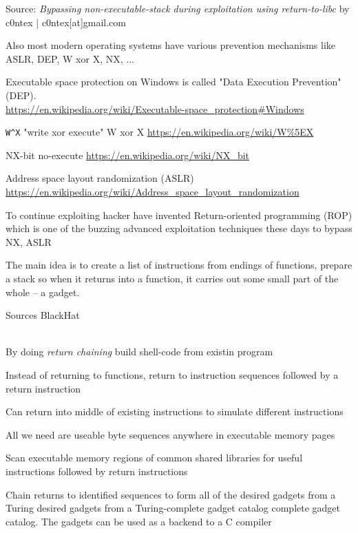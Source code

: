 \documentclass[Screen16to9,17pt]{foils}
\begin{document}
Source:
\emph{Bypassing non-executable-stack during exploitation using return-to-libc}
 by c0ntex | c0ntex[at]gmail.com



Also most modern operating systems have various prevention mechanisms like ASLR, DEP, W xor X, NX, ...

\begin{list2}
\item Executable space protection on Windows is called "Data Execution Prevention" (DEP).\\
\url{https://en.wikipedia.org/wiki/Executable-space_protection#Windows}
\item \verb+W^X+ "write xor execute" W xor X \url{https://en.wikipedia.org/wiki/W%5EX}
\item NX-bit no-execute \url{https://en.wikipedia.org/wiki/NX_bit}
\item Address space layout randomization (ASLR) \url{https://en.wikipedia.org/wiki/Address_space_layout_randomization}
\end{list2}


To continue exploiting hacker have invented Return-oriented programming (ROP)
which is one of the buzzing advanced exploitation techniques these days to bypass NX, ASLR

The main idea is to create a list of instructions from endings of functions, prepare a stack so when it returns into a function, it carries out some small part of the whole -- a gadget.

Sources BlackHat\\
\\
{\footnotesize{}}



\begin{list2}
\item By doing \emph{return chaining} build shell-code from existin program
\item Instead of returning to
functions, return to
instruction sequences
followed by a return
instruction

\item Can return into middle of
existing instructions to
simulate different
instructions

\item All we need are useable
byte sequences anywhere
in executable memory
pages
\item Scan executable memory regions of common shared
libraries for useful instructions followed by return
instructions
\item Chain returns to identified sequences to form all of the
desired gadgets from a Turing desired gadgets from
a Turing-complete gadget catalog complete gadget catalog. The gadgets can be used as a backend to a C compiler
\end{list2}
\end{document}

